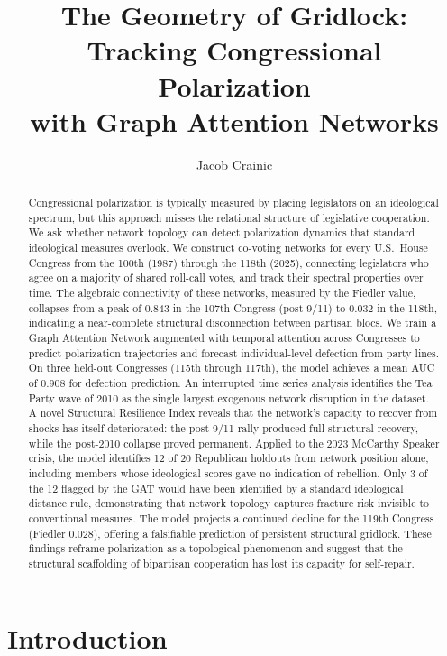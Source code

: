 \documentclass[12pt, a4paper]{article}
\title{\textbf{The Geometry of Gridlock: Tracking Congressional Polarization\\ with Graph Attention Networks}}
\author{Jacob Crainic}
\date{}
\begin{document}
\raggedbottom

\maketitle

\begin{abstract}
Congressional polarization is typically measured by placing legislators on an ideological spectrum, but this approach misses the relational structure of legislative cooperation. We ask whether network topology can detect polarization dynamics that standard ideological measures overlook. We construct co-voting networks for every U.S.\ House Congress from the 100th (1987) through the 118th (2025), connecting legislators who agree on a majority of shared roll-call votes, and track their spectral properties over time. The algebraic connectivity of these networks, measured by the Fiedler value, collapses from a peak of 0.843 in the 107th Congress (post-9/11) to 0.032 in the 118th, indicating a near-complete structural disconnection between partisan blocs. We train a Graph Attention Network augmented with temporal attention across Congresses to predict polarization trajectories and forecast individual-level defection from party lines. On three held-out Congresses (115th through 117th), the model achieves a mean AUC of 0.908 for defection prediction. An interrupted time series analysis identifies the Tea Party wave of 2010 as the single largest exogenous network disruption in the dataset. A novel Structural Resilience Index reveals that the network's capacity to recover from shocks has itself deteriorated: the post-9/11 rally produced full structural recovery, while the post-2010 collapse proved permanent. Applied to the 2023 McCarthy Speaker crisis, the model identifies 12 of 20 Republican holdouts from network position alone, including members whose ideological scores gave no indication of rebellion. Only 3 of the 12 flagged by the GAT would have been identified by a standard ideological distance rule, demonstrating that network topology captures fracture risk invisible to conventional measures. The model projects a continued decline for the 119th Congress (Fiedler 0.028), offering a falsifiable prediction of persistent structural gridlock. These findings reframe polarization as a topological phenomenon and suggest that the structural scaffolding of bipartisan cooperation has lost its capacity for self-repair.
\end{abstract}

\section{Introduction}
\end{document}
